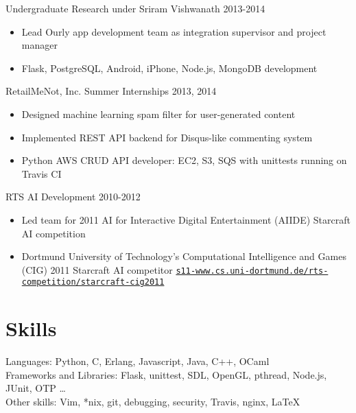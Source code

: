 \documentclass[line,margin]{res}
\begin{document}
\begin{resume}
\vspace{-6pt}
Undergraduate Research under Sriram Vishwanath
\hfill  2013-2014
    \begin{itemize} \itemsep -2pt %
    \item Lead Ourly app development team as integration supervisor and project manager
    \item Flask, PostgreSQL, Android, iPhone, Node.js, MongoDB development
    \end{itemize}

\vspace{-6pt}
RetailMeNot, Inc. Summer Internships
\hfill  2013, 2014
    \begin{itemize} \itemsep -2pt %
    \item Designed machine learning spam filter for user-generated content
    \item Implemented REST API backend for Disqus-like commenting system
    \item Python AWS CRUD API developer: EC2, S3, SQS with unittests running on Travis CI
    \end{itemize}

\vspace{-6pt}
RTS AI Development
\hfill  2010-2012
    \begin{itemize} \itemsep -2pt %
    \item Led team for 2011 AI for Interactive Digital Entertainment (AIIDE) Starcraft AI competition  
    \item Dortmund University of Technology’s Computational Intelligence and Games (CIG) 2011 Starcraft AI
        competitor \href{https://www.s11-www.cs.uni-dortmund.de/rts-competition/starcraft-cig2011}{\texttt{s11-www.cs.uni-dortmund.de/rts-competition/starcraft-cig2011}}
    \end{itemize}


\vspace{-8pt}
\section{Skills}
\vspace{12pt} 
    Languages: Python, C, Erlang, Javascript, Java, C++, OCaml \\ 
    Frameworks and Libraries: Flask, unittest, SDL, OpenGL, pthread, Node.js, JUnit, OTP \ldots \\
    Other skills: Vim, *nix, git, debugging, security, Travis, nginx, \LaTeX



\end{resume}
\end{document}
